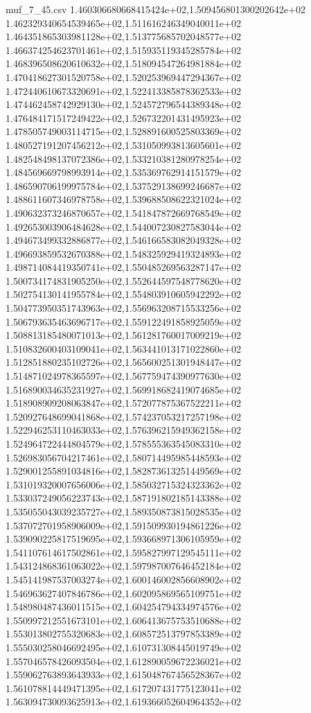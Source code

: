 \begin{filecontents*}{muf_7_45.csv}
1.460306680668415424e+02,1.509456801300202642e+02
1.462329340654539465e+02,1.511616246349040011e+02
1.464351865303981128e+02,1.513775685702048577e+02
1.466374254623701461e+02,1.515935119345285784e+02
1.468396508620610632e+02,1.518094547264981884e+02
1.470418627301520758e+02,1.520253969447294367e+02
1.472440610673320691e+02,1.522413385878362533e+02
1.474462458742929130e+02,1.524572796544389348e+02
1.476484171517249422e+02,1.526732201431495923e+02
1.478505749003114715e+02,1.528891600525803369e+02
1.480527191207456212e+02,1.531050993813605601e+02
1.482548498137072386e+02,1.533210381280978254e+02
1.484569669798993914e+02,1.535369762914151579e+02
1.486590706199975784e+02,1.537529138699246687e+02
1.488611607346978758e+02,1.539688508622321024e+02
1.490632373246870657e+02,1.541847872669768549e+02
1.492653003906484628e+02,1.544007230827583044e+02
1.494673499332886877e+02,1.546166583082049328e+02
1.496693859532670388e+02,1.548325929419324893e+02
1.498714084419350741e+02,1.550485269563287147e+02
1.500734174831905250e+02,1.552644597548778620e+02
1.502754130141955784e+02,1.554803910605942292e+02
1.504773950351743963e+02,1.556963208715533256e+02
1.506793635463696717e+02,1.559122491858925059e+02
1.508813185480071013e+02,1.561281760017009219e+02
1.510832600403109041e+02,1.563441013171022860e+02
1.512851880235102726e+02,1.565600251301948447e+02
1.514871024978365597e+02,1.567759474390977630e+02
1.516890034635231927e+02,1.569918682419074685e+02
1.518908909208063847e+02,1.572077875367522211e+02
1.520927648699041868e+02,1.574237053217257198e+02
1.522946253110463033e+02,1.576396215949362158e+02
1.524964722444804579e+02,1.578555363545083310e+02
1.526983056704217461e+02,1.580714495985448593e+02
1.529001255891034816e+02,1.582873613251449569e+02
1.531019320007656006e+02,1.585032715324323362e+02
1.533037249056223743e+02,1.587191802185143388e+02
1.535055043039235727e+02,1.589350873815028535e+02
1.537072701958906009e+02,1.591509930194861226e+02
1.539090225817519695e+02,1.593668971306105959e+02
1.541107614617502861e+02,1.595827997129545111e+02
1.543124868361063022e+02,1.597987007646452184e+02
1.545141987537003274e+02,1.600146002856608902e+02
1.546963627407846786e+02,1.602095869565109751e+02
1.548980487436011515e+02,1.604254794334974576e+02
1.550997212551673101e+02,1.606413675753510688e+02
1.553013802755320683e+02,1.608572513797853389e+02
1.555030258046692495e+02,1.610731308445019749e+02
1.557046578426093504e+02,1.612890059672236021e+02
1.559062763893643933e+02,1.615048767456528367e+02
1.561078814449471395e+02,1.617207431775123041e+02
1.563094730093625913e+02,1.619366052604964352e+02

\end{filecontents*}
